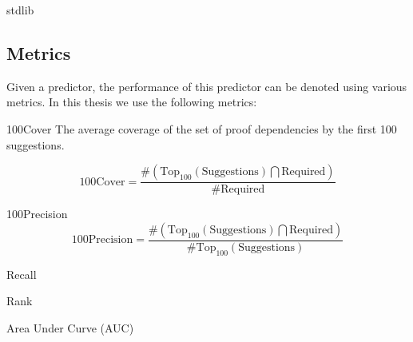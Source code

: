 \begin{description}
	\item[\coq stdlib]
	\item[\compcert]
    \item[\formalin]
    \item[\corn]
    \item[\mathcomp]
\end{description}

\subsection{Metrics}
Given a predictor, the performance of this predictor can be denoted using various metrics.
In this thesis we use the following metrics:


\begin{definition}{100Cover}
The average coverage of the set of proof dependencies by the first 100 suggestions.

\[ \text{100Cover} = \frac{ \#( \text{Top}_{100}(\text{Suggestions}) \bigcap \text{Required}) } { \#\text{Required} } \]
\end{definition}


\begin{definition}{100Precision}
\[ \text{100Precision} = \frac{ \#( \text{Top}_{100}(\text{Suggestions}) \bigcap \text{Required}) } { \#\text{Top}_{100}(\text{Suggestions}) } \]
\end{definition}

\begin{definition}{Recall}
\end{definition}

\begin{definition}{Rank}
\end{definition}

\begin{definition}{Area Under Curve (AUC)}
\end{definition}

